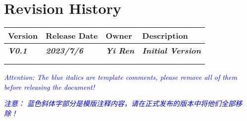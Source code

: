 
\clearpage



{\centering\section*{Revision History}}

\vspace{-0.5cm}
\begin{table}[hp]
    \centering
    \begin{tabularx}{\linewidth}{|X|X|X|X|}
    \hline
    \rowcolor[HTML]{009901} 
    {\color[HTML]{000000} \textbf{Version}}       & {\color[HTML]{000000} \textbf{Release Date}}      & {\color[HTML]{000000} \textbf{Owner}}           & {\color[HTML]{000000} \textbf{Description}}              \\ \hline
    {\color[HTML]{3BA8C8} \textit{\textbf{V0.1}}} & {\color[HTML]{3BA8C8} \textit{\textbf{2023/7/6}}} & {\color[HTML]{3BA8C8} \textit{\textbf{Yi Ren}}} & {\color[HTML]{3BA8C8} \textit{\textbf{Initial Version}}} \\ \hline
    {\color[HTML]{3BA8C8} \textit{\textbf{}}}     & {\color[HTML]{3BA8C8} \textit{\textbf{}}}         & {\color[HTML]{3BA8C8} \textit{\textbf{}}}       & {\color[HTML]{3BA8C8} \textit{\textbf{}}}                \\ \hline
    {\color[HTML]{329A9D} \textit{\textbf{}}}     & {\color[HTML]{329A9D} \textit{\textbf{}}}         & {\color[HTML]{329A9D} \textit{\textbf{}}}       & {\color[HTML]{329A9D} \textit{\textbf{}}}                \\ \hline
    \end{tabularx}
\end{table}


\vspace*{120pt}

\noindent\textcolor{blue}{\textit{Attention: The blue italics are template comments, please remove all of them before releasing the document!}}

\vspace*{12pt}

\noindent\textcolor{blue}{\textit{注意： 蓝色斜体字部分是模版注释内容，请在正式发布的版本中将他们全部移除！}}
